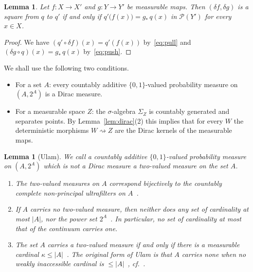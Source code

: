 \documentclass[11pt,a4paper]{article}
\theoremstyle{plain}
\newtheorem{lemma}[theorem]{Lemma}
\theoremstyle{definition}
\theoremstyle{remark}
\newcommand{\Prb}{\mathcal{P}}
\newcommand{\del}{\delta}
\begin{document}
\begin{lemma}\label{lem:square-pointwise}
Let $f \colon X \to X'$ and $g \colon Y \to Y'$ be measurable maps. Then
$(\del f, \del g)$ is a square from $q$ to $q'$ if and only if
$q'\bigl(f(x)\bigr) = g_{*}\, q(x)$ in $\Prb(Y')$ for every $x \in X$.
\end{lemma}

\begin{proof}
We have $(q' \circ \del f)(x) = q'(f(x))$ by~\eqref{eq:pull} and
$(\del g \circ q)(x) = g_{*}\, q(x)$ by~\eqref{eq:push}.
\end{proof}

We shall use the following two conditions.
\begin{itemize}
\item[(a)] For a set $A$: every countably additive $\{0,1\}$-valued
probability measure on $(A,2^{A})$ is a Dirac measure.
\item[(b)] For a measurable space $Z$: the $\sigma$-algebra $\Sigma_{Z}$ is
countably generated and separates points. By Lemma~\ref{lem:dirac}(2) this
implies that for every $W$ the deterministic morphisms $W \rightsquigarrow Z$
are the Dirac kernels of the measurable maps.
\end{itemize}

\begin{lemma}[Ulam]\label{lem:app-ulam}
We call a countably additive $\{0,1\}$-valued probability measure on
$(A, 2^{A})$ which is not a Dirac measure a \emph{two-valued measure} on the
set $A$.
\begin{enumerate}
\item The two-valued measures on $A$ correspond bijectively to the countably
complete non-principal ultrafilters on
$A$~\cite[(10.3)--(10.4)]{jech_set_2003}.
\item If $A$ carries no two-valued measure, then neither does any set of
cardinality at most $|A|$, nor the power set
$2^{A}$~\cite[Bem.~2 and Satz~1]{ulam_masstheorie_1930}. In particular, no set
of cardinality at most that of the continuum carries one.
\item The set $A$ carries a two-valued measure if and only if there is a
measurable cardinal
$\kappa \le |A|$~\cite[Lemma~10.2 and Def.~10.3]{jech_set_2003}. The original
form of Ulam is that $A$ carries none when no weakly inaccessible cardinal is
$\le |A|$~\cite[Satz~(A)]{ulam_masstheorie_1930},
cf.~\cite[Thm.~10.1]{jech_set_2003}.
\end{enumerate}
\end{lemma}
\end{document}
